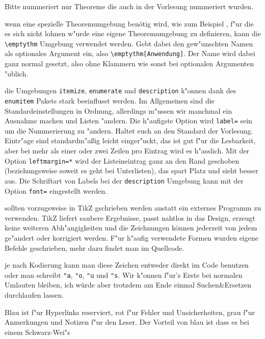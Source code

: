 \documentclass[paper=A4, twoside, chapterprefix=true, bibliography=totoc, headsepline]{scrbook}
\begin{document}
\begin{description}[font=\normalfont\itshape]
	Bitte nummeriert nur Theoreme die auch in der Vorlesung nummeriert wurden.
\item[Spezielle Theoreme:] wenn eine spezielle Theoremumgebung
    benötig wird, wie zum Beispiel , f"ur die es sich
    nicht lohnen w"urde eine eigene Theoremumgebung zu definieren,
    kann die \verb|\emptythm| Umgebung verwendet werden. Gebt dabei
    den gew"unschten Namen als optionales Argument ein, also
    \verb|\emptythm[Anwendung]|. Der Name wird dabei ganz normal
    gesetzt, also ohne Klammern wie sonst bei optionalen Argumenten
    "ublich.
  \item[Listen und Aufz"ahlungen:] die Umgebungen \verb|itemize|,
    \verb|enumerate| und \verb|description| k"onnen dank des
    \verb|enumitem| Pakets stark beeinflusst werden. Im Allgemeinen
    sind die Standardeinstellungen in Ordnung, allerdings m"ussen wir
    manchmal ein Ausnahme machen und Listen "andern. Die h"aufigste
    Option wird \verb|label=| sein um die Nummerierung zu
    "andern. Haltet euch an den Standard der Vorlesung. Eintr"age sind
    standardm"a\ss ig leicht einger"uckt, das ist gut f"ur die
    Lesbarkeit, aber bei mehr als einer oder zwei Zeilen pro Eintrag
    wird es h"asslich. Mit der Option \verb|leftmargin=*| wird der
    Listeineintrag ganz an den Rand geschoben (beziehungsweise soweit
    es geht bei Unterlisten), das spart Platz und sieht besser
    aus. Die Schriftart von Labels bei der \verb|description| Umgebung
    kann mit der Option \verb|font=| eingestellt werden.
  \item[Zeichungen:] sollten vorzugsweise in TikZ gschrieben werden
    anstatt ein externes Programm zu verwenden. TikZ liefert saubere
    Ergebnisse, passt nahtlos in das Design, erzeugt keine weiteren
    Abh"angigkeiten und die Zeichnungen können jederzeit von jedem
    ge"andert oder korrigiert werden. F"ur h"aufig verwendete Formen
    wurden eigene Befehle geschrieben, mehr dazu findet man im
    Quellcode.
  \item[Umlaute und "s:] je nach Kodierung kann man diese Zeichen
    entweder direkt im Code benutzen oder man schreibt \verb|"a|,
    \verb|"o|, \verb|"u| und \verb|"s|. Wir k"onnen f"ur's Erste bei
    normalen Umlauten bleiben, ich würde aber trotzdem am Ende einmal
    Suchen\&Ersetzen durchlaufen lassen.
  \item[Farben:] Blau ist f"ur Hyperlinks reserviert, rot f"ur Fehler
    und Unsicherheiten, grau f"ur Anmerkungen und Notizen f"ur den
    Leser. Der Vorteil von blau ist dass es bei einem Schwarz-Wei"s

\end{description}
\end{document}
